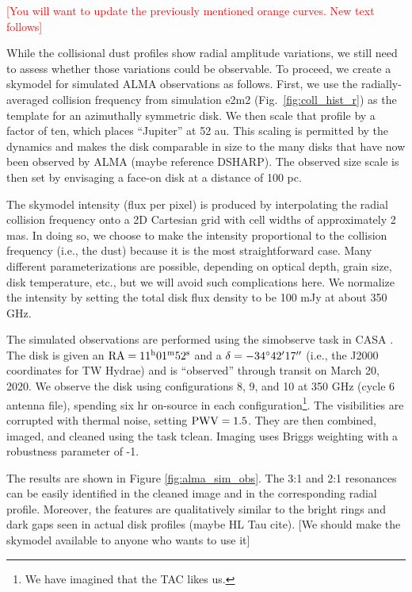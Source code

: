 \documentclass[twocolumn]{aastex63}
\newcommand{\ACBc}[1]{\textcolor{red}{#1}}
\begin{document}
\ACBc{[You will want to update the previously mentioned orange curves. New text follows]} 

While the collisional dust profiles show radial amplitude variations, we still need to assess whether those variations could be observable.  
To proceed, we create a skymodel for simulated ALMA observations as follows. First, we use the radially-averaged collision frequency from simulation e2m2 (Fig.~\ref{fig:coll_hist_r}) as the template for an azimuthally symmetric disk.  
We then scale that profile by a factor of ten, which places ``Jupiter'' at 52 au.  
This scaling is permitted by the dynamics and makes the disk comparable in size to the many disks that have now been observed by ALMA (maybe reference DSHARP).  
The observed size scale is then set by envisaging a face-on disk at a distance of 100 pc.  

The skymodel intensity (flux per pixel) is produced by interpolating the radial collision frequency onto a 2D Cartesian grid with cell widths of approximately 2 mas. 
In doing so, we choose to make the intensity proportional to the collision frequency (i.e., the dust) because it is the most straightforward case. 
Many different parameterizations are possible, depending on optical depth, grain size, disk temperature, etc., but we will avoid such complications here. 
We normalize the intensity by setting the total disk flux density to be 100 mJy at about 350 GHz.  

The simulated observations are performed using the {simobserve} task in {\sc CASA} \citep{2007ASPC..376..127M}.  The disk is given an $\rm RA = 11^{\rm h} 01^{\rm m} 52^{\rm s}$ and a $\delta = -34^\circ 42\mbox{$^\prime$} 17\mbox{$^{\prime\prime}$}$ (i.e., the J2000 coordinates for TW Hydrae) and is ``observed'' through transit on March 20, 2020. 
We observe the disk using configurations 8, 9, and 10 at 350 GHz (cycle 6 antenna file), spending six hr on-source in each configuration\footnote{We have imagined that the TAC likes us.}.  
The visibilities are corrupted with thermal noise, setting $\rm PWV=1.5$. 
They are then combined, imaged, and cleaned using the task tclean. Imaging uses Briggs weighting with a robustness parameter of -1. 

The results are shown in Figure \ref{fig:alma_sim_obs}.  The 3:1 and 2:1 resonances can be easily identified in the cleaned image and in the corresponding radial profile.  Moreover, the features are qualitatively similar to the bright rings and dark gaps seen in actual disk profiles (maybe HL Tau cite). [We should make the skymodel available to anyone who wants to use it]
\end{document}
